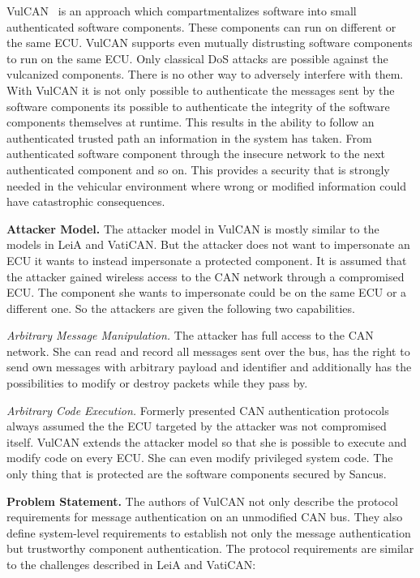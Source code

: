 VulCAN~\cite{VanBulck2017} is an approach which compartmentalizes software into
small authenticated software components. These components can run on different
or the same ECU\@. VulCAN supports even mutually distrusting software components
to run on the same ECU\@. Only classical DoS attacks are possible against the
vulcanized components. There is no other way to adversely interfere with them.
With VulCAN it is not only possible to authenticate the messages sent by the
software components its possible to authenticate the integrity of the software
components themselves at runtime. This results in the ability to follow an
authenticated trusted path an information in the system has taken. From
authenticated software component through the insecure network to the next
authenticated component and so on. This provides a security that is strongly
needed in the vehicular environment where wrong or modified information could
have catastrophic consequences.

\par{\textbf{Attacker Model.}} The attacker model in VulCAN is mostly similar to the
models in LeiA and VatiCAN\@. But the attacker does not want to impersonate an
ECU it wants to instead impersonate a protected component. It is assumed that
the attacker gained wireless access to the CAN network through a compromised
ECU\@. The component she wants to impersonate could be on the same ECU or a
different one. So the attackers are given the following two capabilities.

\textit{Arbitrary Message Manipulation.} The attacker has full access to the CAN
network. She can read and record all messages sent over the bus, has the right
to send own messages with arbitrary payload and identifier and additionally has
the possibilities to modify or destroy packets while they pass by.

\textit{Arbitrary Code Execution.} Formerly presented CAN authentication
protocols always assumed the the ECU targeted by the attacker was not
compromised itself. VulCAN extends the attacker model so that she is possible to
execute and modify code on every ECU\@. She can even modify privileged system
code. The only thing that is protected are the software components secured by
Sancus.

\smallskip
\par{\textbf{Problem Statement.}} The authors of VulCAN not only describe the
protocol requirements for message authentication on an unmodified CAN bus. They
also define system-level requirements to establish not only the message
authentication but trustworthy component authentication. The protocol
requirements are similar to the challenges described in LeiA and VatiCAN\@:

